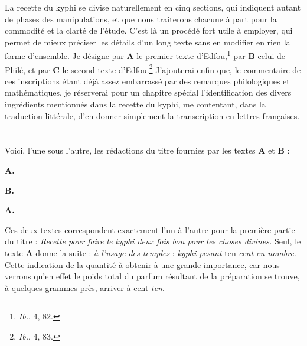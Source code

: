 \documentclass[a4paper, 11pt, oneside, landscape]{article}
\newcommand*\hieroAAAE{}
\newcommand*\hieroAAAI{}
\newcommand*\hieroAAAR{}
\newcommand*\hieroAABT{}
\newcommand*\hieroAADL{}
\newcommand*\hieroAAED{}
\newcommand*\hieroAAEG{}
\newcommand*\hieroAAEI{}
\newcommand*\hieroAAEJ{}
\newcommand*\hieroAAEK{}
\newcommand*\hieroAAEL{}
\newcommand*\hieroAAEM{}
\newcommand*\hieroAAEO{}
\newcommand*\hieroAAER{}
\newcommand*\hieroAAES{}
\newcommand*\hieroAAET{}
\newcommand*\hieroAAEU{}
\newcommand*\hieroAAEV{}
\newcommand*\hieroAAEW{}
\newcommand*\hieroAAEX{}
\newcommand*\hieroAAEY{}
\newcommand*\hieroAAEZ{}
\newcommand*\hieroAAFA{}
\begin{document}
La recette du kyphi se divise naturellement en cinq sections, qui indiquent autant de phases des manipulations, et que nous traiterons chacune à part pour la commodité et la clarté de l'étude. C'est là un procédé fort utile à employer, qui permet de mieux préciser les détails d'un long texte sans en modifier en rien la forme d'ensemble. Je désigne par \textbf{A} le premier texte d'Edfou,\footnote{\emph{Ib.}, 4, 82.} par \textbf{B} celui de Philé, et par \textbf{C} le second texte d'Edfou.\footnote{\emph{Ib.}, 4, 83.} J'ajouterai enfin que, le commentaire de ces inscriptions étant déjà assez embarrassé par des remarques philologiques et mathématiques, je réserverai pour un chapitre spécial l'identification des divers ingrédients mentionnés dans la recette du kyphi, me contentant, dans la traduction littérale, d'en donner simplement la transcription en lettres françaises.
\clearpage
\section{}
\paragraph{}
Voici, l'une sous l'autre, les rédactions du titre fournies par les textes \textbf{A} et \textbf{B} :

\hspace*{10mm}\textbf{A.}\hspace*{5mm} $\hieroAAER\:\hieroAAES\:\hieroAABT\:\hieroAAET\:\hieroAAAE\:\hieroAAAR\:\hieroAAEJ\:\hieroAAEG\:\hieroAAED\:\hieroAAAI\:\hieroAAEU\:\hieroAAEV\:\hieroAAEI\:\hieroAAEW\:\hieroAABT\:\hieroAAAE\:\hieroAAAR\:\hieroAAEX$

\hspace*{10mm}\textbf{B.}\hspace*{5mm} $\hieroAAEY\:\hieroAAES\:\hieroAADL\:\hieroAAET\:\hieroAAEK\:\hieroAAEL\:\hieroAAEG\:\hieroAAEG\:\hieroAAEM\:\hieroAAAI\:\hieroAAEZ\:\hieroAADL\:\hieroAAEO$

\hspace*{10mm}\textbf{A.}\hspace*{5mm} $\hieroAAFA\:\hieroAABT$

Ces deux textes correspondent exactement l'un à l'autre pour la première partie du titre : \emph{Recette pour faire le kyphi deux fois bon pour les choses divines.} Seul, le texte \textbf{A} donne la suite : \emph{à l'usage des temples} : \emph{kyphi pesant} ten \emph{cent en nombre}. Cette indication de la quantité à obtenir à une grande importance, car nous verrons qu'en effet le poids total du parfum résultant de la préparation se trouve, à quelques grammes près, arriver à cent \emph{ten}. 
\end{document}
